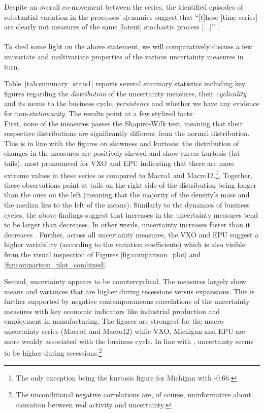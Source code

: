 \documentclass[a4paper,11pt,listof=nochaptergap,oneside,pointednumbers,bibtotoc,bigheadings,liststotoc]{scrbook}
\begin{document}
Despite an overall co-movement between the series, the identified episodes of substantial variation in the processes' dynamics suggest that ``[t]hese [time series] are clearly not measures of the same [latent] stochastic process [...]'' \citep[p. ]{orlikandveldkamp:14}.\\
\\
To shed some light on the above statement, we will comparatively discuss a few univariate and multivariate properties of the various uncertainty measures in turn.

Table~\ref{tab:summary_stats1} reports several summary statistics including key figures regarding the \textit{distribution} of the uncertainty measures, their \textit{cyclicality} and its nexus to the business cycle, \textit{persistence} and whether we have any evidence for non-\textit{stationarity}. The results point at a few stylized facts:\\
First, none of the measures passes the Shapiro-Wilk test, meaning that their respective distributions are significantly different from the normal distribution. This is in line with the figures on skewness and kurtosis: the distribution of changes in the measures are positively skewed and show excess kurtosis (fat tails), most pronounced for VXO and EPU indicating that there are more extreme values in these series as compared to Macro1 and Macro12.\footnote{The only exception being the kurtosis figure for Michigan with -0.66.}. Together, these observations point at tails on the right side of the distribution being longer than the ones on the left (meaning that the majority of the density's mass and the median lies to the left of the means). Similarly to the dynamics of business cycles, the above findings suggest that increases in the uncertainty measures tend to be larger than decreases. In other words, uncertainty increases faster than it decreases \citep{moore:17}. Further, across all uncertainty measures, the VXO and EPU suggest a higher variability (according to the variation coefficients) which is also visible from the visual inspection of Figures \ref{fig:comparison_plot} and \ref{fig:comparison_plot_combined}.

Second, uncertainty appears to be countercyclical. The measures largely show means and variances that are higher during recessions versus expansions. This is further supported by negative contemporaneous correlations of the uncertainty measures with key economic indicators like industrial production and employment in manufacturing. The figures are strongest for the macro uncertainty series (Macro1 and Macro12) while VXO, Michigan and EPU are more weakly associated with the business cycle. In line with \citet{bloom:14}, uncertainty seems to be higher during recessions.\footnote{The unconditional negative correlations are, of course, uninformative about causation between real activity and uncertainty.}
\end{document}
